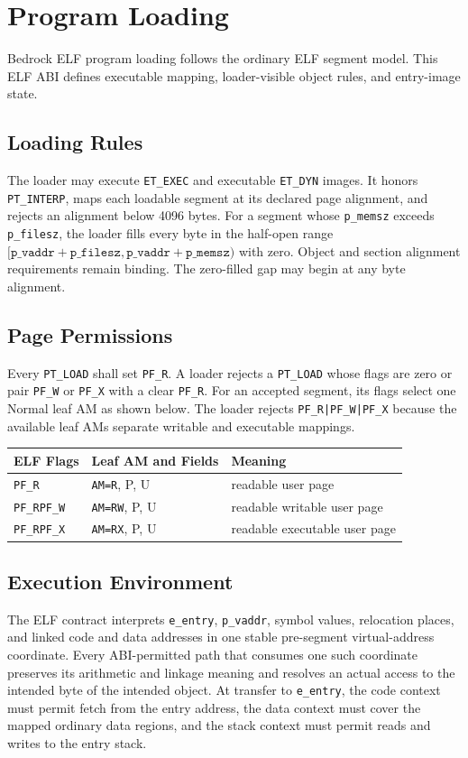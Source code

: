 \documentclass[10pt,twoside]{article}
\begin{document}
\clearpage
\section{Program Loading}\label{page:program-loading}
Bedrock ELF program loading follows the ordinary ELF segment model. This ELF
ABI defines executable mapping, loader-visible object rules, and entry-image
state.
\subsection{Loading Rules}
The loader may execute \texttt{ET\_EXEC} and executable \texttt{ET\_DYN}
images. It honors \texttt{PT\_INTERP}, maps each loadable segment at its
declared page alignment, and rejects an alignment below 4096 bytes. For a
segment whose \texttt{p\_memsz} exceeds \texttt{p\_filesz}, the loader fills
every byte in the half-open range
$[\texttt{p\_vaddr}+\texttt{p\_filesz},
\texttt{p\_vaddr}+\texttt{p\_memsz})$ with zero. Object and section alignment
requirements remain binding. The zero-filled gap may begin at any byte
alignment.
\subsection{Page Permissions}
Every \texttt{PT\_LOAD} shall set \texttt{PF\_R}. A loader rejects a
\texttt{PT\_LOAD} whose flags are zero or pair \texttt{PF\_W} or
\texttt{PF\_X} with a clear \texttt{PF\_R}. For an accepted segment, its flags
select one Normal leaf AM as shown below. The loader rejects
\texttt{PF\_R|PF\_W|PF\_X} because the available leaf AMs separate writable
and executable mappings.

\begingroup\footnotesize
\setlength{\tabcolsep}{2pt}
\begin{longtable}{@{}p{1.2in}p{1.45in}p{2.85in}@{}}
\toprule
\textbf{ELF Flags} & \textbf{Leaf AM and Fields} & \textbf{Meaning}\\
\midrule
\endhead
\texttt{PF\_\allowbreak{}R} & \texttt{AM=R}, P, U & readable user page\\
\texttt{PF\_\allowbreak{}R\textbar{}PF\_\allowbreak{}W} & \texttt{AM=RW}, P, U & readable writable user page\\
\texttt{PF\_\allowbreak{}R\textbar{}PF\_\allowbreak{}X} & \texttt{AM=RX}, P, U & readable executable user page\\
\bottomrule
\end{longtable}
\endgroup
\subsection{Execution Environment}
The ELF contract interprets \texttt{e\_entry}, \texttt{p\_vaddr}, symbol
values, relocation places, and linked code and data addresses in one stable
pre-segment virtual-address coordinate. Every ABI-permitted path that consumes
one such coordinate preserves its arithmetic and linkage meaning and resolves
an actual access to the intended byte of the intended object. At transfer to \texttt{e\_entry},
the code context must permit fetch from the entry address, the data context
must cover the mapped ordinary data regions, and the stack context must permit
reads and writes to the entry stack.
\end{document}

